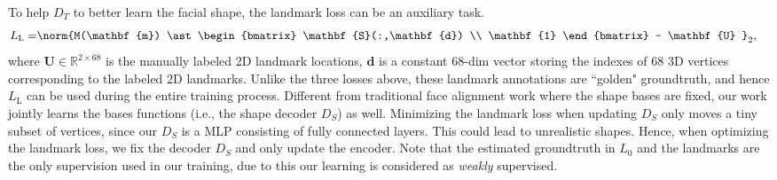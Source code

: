 To help $D_T$ to better learn the facial shape, the landmark loss can be an auxiliary task. 
\begin{align}
L_{\text{L}} = & \norm {M(\mathbf{m}) \ast \begin{bmatrix} \mathbf{S}(:,\mathbf{d}) \\ \mathbf{1} \end{bmatrix} - \mathbf{U} }_2,
\label{eq:landmarkloss}
\end{align}
where $\mathbf{U} \in \mathbb{R}^{2{\times} 68}$ is the manually labeled 2D landmark locations, $\mathbf{d}$ is a constant $68$-dim vector storing the indexes of $68$ 3D vertices corresponding to the labeled 2D landmarks.
Unlike the three losses above, these landmark annotations are ``golden" groundtruth, and hence $L_{\text{L}}$ can be used during the entire training process. 
Different from traditional face alignment work where the shape bases are fixed, our work jointly learns
the bases functions (i.e., the shape decoder $D_S$) as well. 
Minimizing the landmark loss when updating $D_S$ only moves a tiny subset of vertices, since our $D_S$ is a MLP consisting of fully connected layers.
This could lead to unrealistic shapes. 	
Hence, when optimizing the landmark loss, we fix the decoder $D_S$ and only update the encoder.
Note that the estimated groundtruth in $L_0$ and the landmarks are the only supervision used in our training, due to this our learning is considered as {\it weakly} supervised. 
